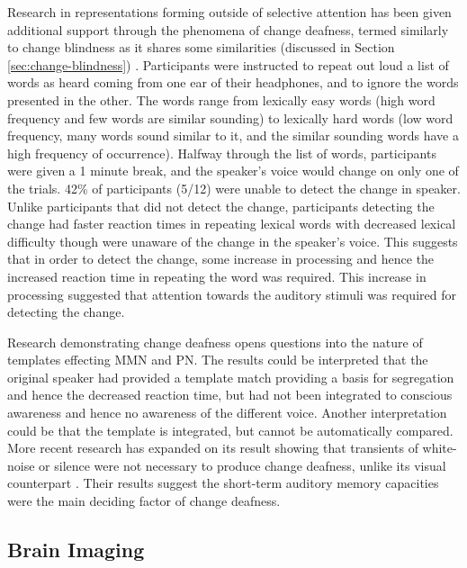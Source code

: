 Research in representations forming outside of selective attention has been given additional support through the phenomena of change deafness, termed similarly to change blindness as it shares some similarities (discussed in Section \ref{sec:change-blindness}) \cite{Vitevitch2000}.  Participants were instructed to repeat out loud a list of words as heard coming from one ear of their headphones, and to ignore the words presented in the other.  The words range from lexically easy words (high word frequency and few words are similar sounding) to lexically hard words (low word frequency, many words sound similar to it, and the similar sounding words have a high frequency of occurrence).  Halfway through the list of words, participants were given a 1 minute break, and the speaker's voice would change on only one of the trials.  42\% of participants (5/12) were unable to detect the change in speaker.  Unlike participants that did not detect the change, participants detecting the change had faster reaction times in repeating lexical words with decreased lexical difficulty though were unaware of the change in the speaker's voice.  This suggests that in order to detect the change, some increase in processing and hence the increased reaction time in repeating the word was required.  This increase in processing suggested that attention towards the auditory stimuli was required for detecting the change.  

Research demonstrating change deafness opens questions into the nature of templates effecting MMN and PN.  The results could be interpreted that the original speaker had provided a template match providing a basis for segregation and hence the decreased reaction time, but had not been integrated to conscious awareness and hence no awareness of the different voice.  Another interpretation could be that the template is integrated, but cannot be automatically compared.  More recent research has expanded on its result showing that transients of white-noise or silence were not necessary to produce change deafness, unlike its visual counterpart \cite{TURATTO2008}.  Their results suggest the short-term auditory memory capacities were the main deciding factor of change deafness.  

\subsection{Brain Imaging}

